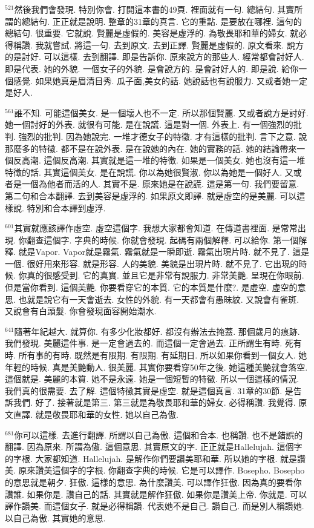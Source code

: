 \documentclass{book}
\begin{document}
$^{521}$然後我們會發現.
特別你會.
打開這本書的49頁.
裡面就有一句.
總結句.
其實所謂的總結句.
正正就是說明.
整章的31章的真言.
它的重點.
是要放在哪裡.
這句的總結句.
很重要.
它就說.
賢麗是虛假的.
美容是虛浮的.
為敬畏耶和華的婦女.
就必得稱讚.
我就嘗試.
將這一句.
去到原文.
去到正譯.
賢麗是虛假的.
原文看來.
說方的是討好.
可以這樣.
去到翻譯.
即是告訴你.
原來說方的那些人.
經常都會討好人.
即是代表.
她的外貌.
一個女子的外貌.
是會說方的.
是會討好人的.
即是說.
給你一個感覺.
如果她真是眉清目秀.
瓜子面,美女的話.
她說話也有說服力.
又或者她一定是好人.

$^{561}$誰不知.
可能這個美女.
是一個壞人也不一定.
所以那個賢麗.
又或者說方是討好.
她一個討好的外表.
就很有可能.
是在說謊.
這是對一個.
外表上.
有一個強烈的批判.
強烈的批判.
因為她說完.
一堆才德女子的特徵.
才有這樣的批判.
言下之意.
說那麼多的特徵.
都不是在說外表.
是在說她的內在.
她的實務的話.
她的結論帶來一個反高潮.
這個反高潮.
其實就是這一堆的特徵.
如果是一個美女.
她也沒有這一堆特徵的話.
其實這個美女.
是在說謊.
你以為她很賢淑.
你以為她是一個好人.
又或者是一個為他者而活的人.
其實不是.
原來她是在說謊.
這是第一句.
我們要留意.
第二句和合本翻譯.
去到美容是虛浮的.
如果原文即譯.
就是虛空的是美麗.
可以這樣說.
特別和合本譯到虛浮.

$^{601}$其實就應該譯作虛空.
虛空這個字.
我想大家都會知道.
在傳道書裡面.
是常常出現.
你翻查這個字.
字典的時候.
你就會發現.
起碼有兩個解釋.
可以給你.
第一個解釋.
就是Vapor.
Vapor就是霧氣.
霧氣就是一瞬即逝.
霧氣出現片時.
就不見了.
這是一個.
很好用來形容.
就是形容.
人的美貌.
美貌是出現片時.
就不見了.
它出現的時候.
你真的很感受到.
它的真實.
並且它是非常有說服力.
非常美艷.
呈現在你眼前.
但是當你看到.
這個美艷.
你要看穿它的本質.
它的本質是什麼?.
是虛空.
虛空的意思.
也就是說它有一天會逝去.
女性的外貌.
有一天都會有愚昧紋.
又說會有雀斑.
又說會有白頭髮.
你會發現面容開始潮水.

$^{641}$隨著年紀越大.
就算你.
有多少化妝都好.
都沒有辦法去掩蓋.
那個歲月的痕跡.
我們發現.
美麗這件事.
是一定會過去的.
而這個一定會過去.
正所謂生有時.
死有時.
所有事的有時.
既然是有限期.
有限期.
有延期日.
所以如果你看到一個女人.
她年輕的時候.
真是美艷動人.
很美麗.
其實你要看穿50年之後.
她這種美艷就會落空.
這個就是.
美麗的本質.
她不是永遠.
她是一個短暫的特徵.
所以一個這樣的情況.
我們真的很需要.
去了解.
這個特徵其實是虛空.
就是這個真言.
31章的30節.
是告訴我們.
好了.
接著就是第三.
第三就是為敬畏耶和華的婦女.
必得稱讚.
我覺得.
原文直譯.
就是敬畏耶和華的女性.
她以自己為傲.

$^{681}$你可以這樣.
去進行翻譯.
所謂以自己為傲.
這個和合本.
也稱讚.
也不是錯誤的翻譯.
因為原來.
所謂為傲.
這個意思.
其實原文的字.
正正就是Hallelujah.
這個字的字根.
大家都知道.
Hallelujah.
是解作你們要讚美耶和華.
所以她的字根.
就是讚美.
原來讚美這個字的字根.
你翻查字典的時候.
它是可以譯作.
Bosepho.
Bosepho的意思就是朝夕.
狂傲.
這樣的意思.
為什麼讚美.
可以譯作狂傲.
因為真的要看你讚誰.
如果你是.
讚自己的話.
其實就是解作狂傲.
如果你是讚美上帝.
你就是.
可以譯作讚美.
而這個女子.
就是必得稱讚.
代表她不是自己.
讚自己.
而是別人稱讚她.
以自己為傲.
其實她的意思.
\end{document}
